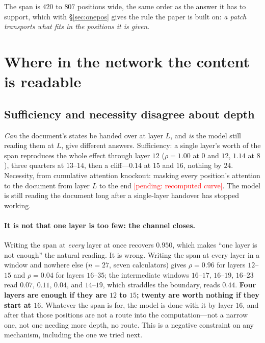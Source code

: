 \documentclass{article}
\newcommand{\PEND}[1]{\textcolor{red}{[pending: #1]}}
\begin{document}
\begin{table}[t]
\caption{The span battery on forty calculators. The restricted split---the
fifteen calculators a wrong document never rescues---is recomputed inside this
set, so no number is inherited from the ten-calculator version. Intervals are
bootstrapped over calculators. The last two rows are the instrument: writing the
receiver's own states back into it, and not patching at all.}
\label{tab:big40}
\centering
\small

\end{table}

The span is $420$ to $807$ positions wide, the same order as the answer it has
to support, which with \S\ref{sec:onepos} gives the rule the paper is built on:
\emph{a patch transports what fits in the positions it is given}.

\section{Where in the network the content is readable}
\label{sec:where}

\subsection{Sufficiency and necessity disagree about depth}
\label{sec:depth}

\emph{Can} the document's states be handed over at layer $L$, and \emph{is} the
model still reading them at $L$, give different answers. Sufficiency: a single
layer's worth of the span reproduces the whole effect through layer $12$
($\rho = 1.00$ at $0$ and $12$, $1.14$ at $8$), three quarters at $13$--$14$,
then a cliff---$0.14$ at $15$ and $16$, nothing by $24$. Necessity, from
cumulative attention knockout: masking every position's attention to the
document from layer $L$ to the end \PEND{recomputed curve}. The model is still
reading the document long after a single-layer handover has stopped working.

\paragraph{It is not that one layer is too few: the channel closes.} Writing the
span at \emph{every} layer at once recovers $0.950$, which makes ``one layer is
not enough'' the natural reading. It is wrong. Writing the span at every layer
in a window and nowhere else ($n=27$, seven calculators) gives $\rho = 0.96$ for
layers $12$--$15$ and $\rho = 0.04$ for layers $16$--$35$; the intermediate
windows $16$--$17$, $16$--$19$, $16$--$23$ read $0.07$, $0.11$, $0.04$, and
$14$--$19$, which straddles the boundary, reads $0.44$. \textbf{Four layers are
enough if they are $12$ to $15$; twenty are worth nothing if they start at
$16$.} Whatever the span is for, the model is done with it by layer $16$, and
after that those positions are not a route into the computation---not a narrow
one, not one needing more depth, no route. This is a negative constraint on any
mechanism, including the one we tried next.
\end{document}
